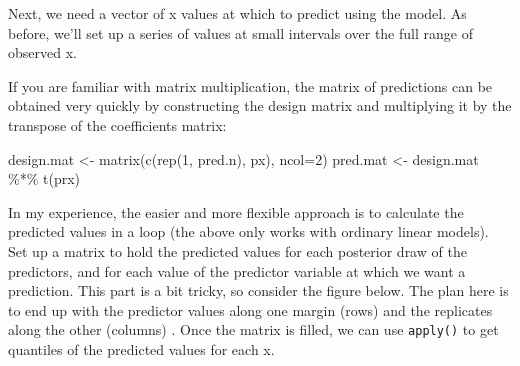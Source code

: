 \documentclass[
  13,
  letterpaper,
]{report}
\newenvironment{Shaded}{\begin{snugshade}}{\end{snugshade}}
\newcommand{\AttributeTok}[1]{\textcolor[rgb]{0.40,0.45,0.13}{#1}}
\newcommand{\CommentTok}[1]{\textcolor[rgb]{0.37,0.37,0.37}{#1}}
\newcommand{\DecValTok}[1]{\textcolor[rgb]{0.68,0.00,0.00}{#1}}
\newcommand{\DocumentationTok}[1]{\textcolor[rgb]{0.37,0.37,0.37}{\textit{#1}}}
\newcommand{\FunctionTok}[1]{\textcolor[rgb]{0.28,0.35,0.67}{#1}}
\newcommand{\NormalTok}[1]{\textcolor[rgb]{0.00,0.23,0.31}{#1}}
\newcommand{\OtherTok}[1]{\textcolor[rgb]{0.00,0.23,0.31}{#1}}
\newcommand{\SpecialCharTok}[1]{\textcolor[rgb]{0.37,0.37,0.37}{#1}}
\newcommand{\StringTok}[1]{\textcolor[rgb]{0.13,0.47,0.30}{#1}}
\begin{document}
\begin{Shaded}
\end{Shaded}

Next, we need a vector of x values at which to predict using the model.
As before, we'll set up a series of values at small intervals over the
full range of observed x.

\begin{Shaded}
\end{Shaded}

If you are familiar with matrix multiplication, the matrix of
predictions can be obtained very quickly by constructing the design
matrix and multiplying it by the transpose of the coefficients matrix:

\begin{Shaded}
\begin{Highlighting}[]
\NormalTok{design.mat }\OtherTok{\textless{}{-}} \FunctionTok{matrix}\NormalTok{(}\FunctionTok{c}\NormalTok{(}\FunctionTok{rep}\NormalTok{(}\DecValTok{1}\NormalTok{, pred.n), px), }\AttributeTok{ncol=}\DecValTok{2}\NormalTok{)}
\NormalTok{pred.mat }\OtherTok{\textless{}{-}}\NormalTok{ design.mat }\SpecialCharTok{\%*\%} \FunctionTok{t}\NormalTok{(prx)}
\end{Highlighting}
\end{Shaded}

In my experience, the easier and more flexible approach is to calculate
the predicted values in a loop (the above only works with ordinary
linear models). Set up a matrix to hold the predicted values for each
posterior draw of the predictors, and for each value of the predictor
variable at which we want a prediction. This part is a bit tricky, so
consider the figure below. The plan here is to end up with the predictor
values along one margin (rows) and the replicates along the other
(columns) . Once the matrix is filled, we can use \texttt{apply()} to
get quantiles of the predicted values for each x.
\end{document}
